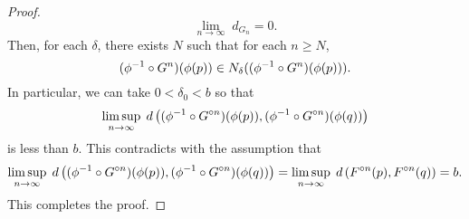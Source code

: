 \documentclass[12pt,draft,twoside]{book}
\begin{document}
\begin{theorem}
\begin{proof}
  \begin{equation*}
    \lim\limits_{n \to \infty}\; d_{G_n} = 0.
  \end{equation*}
  Then, for each $\delta$, there exists $N$ such that for each $n \geq N$,
  \begin{equation*}
    (\phi^{-1} \circ G^n)(\phi(p)) \in N_{\delta}((\phi^{-1} \circ G^n)(\phi(p))).
  \end{equation*}
  In particular, we can take $0 < \delta_0 < b$ so that
  \begin{equation*}
    \limsup\limits_{n \to \infty}\; d\left( (\phi^{-1}\circ G^{\circ n})(\phi(p)) , (\phi^{-1}\circ G^{\circ n})(\phi(q)) \right)
  \end{equation*}
  is less than $b$.
  This contradicts with the assumption that
  \begin{equation*}
    \limsup\limits_{n \to \infty}\; d\left( (\phi^{-1}\circ G^{\circ n})(\phi(p)) , (\phi^{-1}\circ G^{\circ n})(\phi(q)) \right)
    = \limsup\limits_{n \to \infty}\; d\left( F^{\circ n}(p) , F^{\circ n}(q) \right) 
    = b.
    \end{equation*}
  This completes the proof.
  \end{proof}
  \label{thm:liyorke-conj}
\end{theorem}
\end{document}
